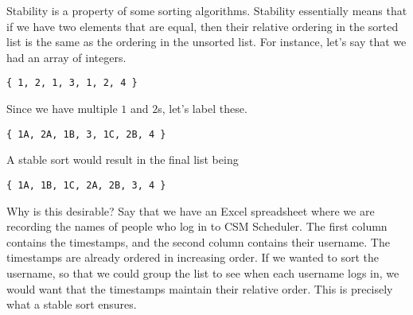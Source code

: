 \begin{blocksection}
Stability is a property of some sorting algorithms. Stability essentially means that if we have two elements that are equal, then their relative ordering in the sorted list is the same as the ordering in the unsorted list. For instance, let's say that we had an array of integers. 

\begin{verbatim}
{ 1, 2, 1, 3, 1, 2, 4 }
\end{verbatim}

Since we have multiple $1$ and $2$s, let's label these. 

\begin{verbatim}
{ 1A, 2A, 1B, 3, 1C, 2B, 4 }
\end{verbatim}

A stable sort would result in the final list being 
\begin{verbatim}
{ 1A, 1B, 1C, 2A, 2B, 3, 4 }
\end{verbatim}

Why is this desirable? Say that we have an Excel spreadsheet where we are recording the names of people who log in to CSM Scheduler. The first column contains the timestamps, and the second column contains their username. The timestamps are already ordered in increasing order. If we wanted to sort the username, so that we could group the list to see when each username logs in, we would want that the timestamps maintain their relative order. This is precisely what a stable sort ensures.

\end{blocksection}
